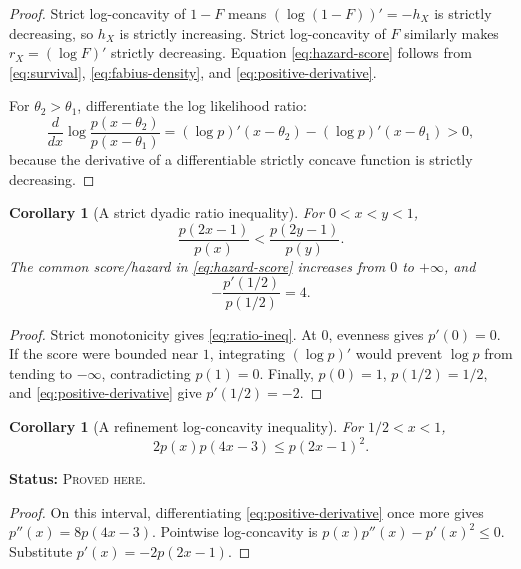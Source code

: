 \documentclass[11pt,oneside]{article}
\newtheorem{corollary}[theorem]{Corollary}
\theoremstyle{definition}
\theoremstyle{remark}
\newcommand{\ProvedHere}{\textcolor{statusgreen}{\textsc{Proved here}}}
\newcommand{\Status}[1]{\par\smallskip\noindent\textbf{Status:} #1.\par\smallskip}
\begin{document}
\begin{proof}
Strict log-concavity of $1-F$ means $(\log(1-F))'=-h_X$ is strictly decreasing,
so $h_X$ is strictly increasing.  Strict log-concavity of $F$ similarly makes
$r_X=(\log F)'$ strictly decreasing.  Equation \eqref{eq:hazard-score} follows
from \eqref{eq:survival}, \eqref{eq:fabius-density}, and
\eqref{eq:positive-derivative}.

For $\theta_2>\theta_1$, differentiate the log likelihood ratio:
\[
 \frac{d}{dx}\log\frac{p(x-\theta_2)}{p(x-\theta_1)}
 = (\log p)'(x-\theta_2)-(\log p)'(x-\theta_1)>0,
\]
because the derivative of a differentiable strictly concave function is strictly
decreasing.
\end{proof}

\begin{corollary}[A strict dyadic ratio inequality]\label{cor:ratio}
For $0<x<y<1$,
\begin{equation}\label{eq:ratio-ineq}
 \frac{p(2x-1)}{p(x)}<\frac{p(2y-1)}{p(y)}.
\end{equation}
The common score/hazard in \eqref{eq:hazard-score} increases from $0$ to
$+\infty$, and
\begin{equation}\label{eq:score-half}
 -\frac{p'(1/2)}{p(1/2)}=4.
\end{equation}
\end{corollary}

\begin{proof}
Strict monotonicity gives \eqref{eq:ratio-ineq}.  At $0$, evenness gives $p'(0)=0$.
If the score were bounded near $1$, integrating $(\log p)'$ would prevent
$\log p$ from tending to $-\infty$, contradicting $p(1)=0$.  Finally,
$p(0)=1$, $p(1/2)=1/2$, and \eqref{eq:positive-derivative} give
$p'(1/2)=-2$.
\end{proof}

\begin{corollary}[A refinement log-concavity inequality]\label{cor:refinement-ineq}
For $1/2<x<1$,
\begin{equation}\label{eq:three-scale-ineq}
 2p(x)p(4x-3)\le p(2x-1)^2.
\end{equation}
\end{corollary}
\Status{\ProvedHere}

\begin{proof}
On this interval, differentiating \eqref{eq:positive-derivative} once more gives
$p''(x)=8p(4x-3)$.  Pointwise log-concavity is
$p(x)p''(x)-p'(x)^2\le0$.  Substitute $p'(x)=-2p(2x-1)$.
\end{proof}
\end{document}
